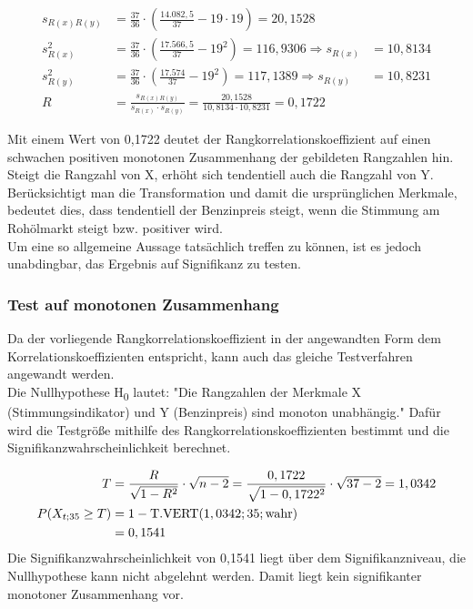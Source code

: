 \begin{align}
  s_{R(x)R(y)} &= \frac{37}{36} \cdot (\frac{14.082,5}{37} - 19 \cdot 19) = 20,1528\\
  s_{R(x)}^2 &=  \frac{37}{36} \cdot (\frac{17.566,5}{37} - 19^2) = 116,9306 \Rightarrow s_{R(x)} &= 10,8134\\
  s_{R(y)}^2 &=  \frac{37}{36} \cdot (\frac{17.574}{37} - 19^2) = 117,1389 \Rightarrow s_{R(y)} &= 10,8231 \\
  R &= \frac{s_{R(x)R(y)}}{s_{R(x)} \cdot s_{R(y)}} = \frac{20,1528}{10,8134 \cdot 10,8231} = 0,1722
\end{align}

Mit einem Wert von 0,1722 deutet der Rangkorrelationskoeffizient auf einen schwachen positiven monotonen Zusammenhang der gebildeten Rangzahlen hin. Steigt die Rangzahl von X, erhöht sich tendentiell auch die Rangzahl von Y. Berücksichtigt man die Transformation und damit die ursprünglichen Merkmale, bedeutet dies, dass tendentiell der Benzinpreis steigt, wenn die Stimmung am Rohölmarkt steigt bzw. positiver wird.\\
Um eine so allgemeine Aussage tatsächlich treffen zu können, ist es jedoch unabdingbar, das Ergebnis auf Signifikanz zu testen.

\subsubsection{Test auf monotonen Zusammenhang}
Da der vorliegende Rangkorrelationskoeffizient in der angewandten Form dem Korrelationskoeffizienten entspricht, kann auch das gleiche Testverfahren angewandt werden.\\
Die Nullhypothese H\textsubscript{0} lautet: "Die Rangzahlen der Merkmale X (Stimmungsindikator) und Y (Benzinpreis) sind monoton unabhängig."
Dafür wird die Testgröße mithilfe des Rangkorrelationskoeffizienten bestimmt und die Signifikanzwahrscheinlichkeit berechnet.

\begin{align}
  T &= \frac{R}{\sqrt{1-R^2}} \cdot \sqrt{n-2} = \frac{0,1722}{\sqrt{1-0,1722^2}} \cdot \sqrt{37-2} = 1,0342\\
  P(X_{t;35} \geq T) &= 1 - \text{T.VERT}(1,0342; 35; \text{wahr})\\
                    &= 0,1541
\end{align}
Die Signifikanzwahrscheinlichkeit von 0,1541 liegt über dem Signifikanzniveau, die Nullhypothese kann nicht abgelehnt werden. Damit liegt kein signifikanter monotoner Zusammenhang vor.



